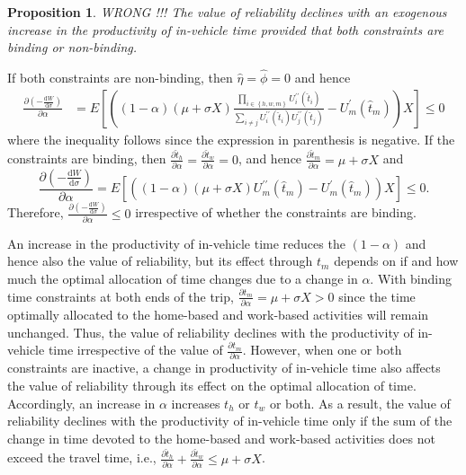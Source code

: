 \documentclass[12pt,a4paper,british]{article}
\makeatletter
\newenvironment{proof}[1][\proofname]{\par
    \normalfont\topsep6\p@\@plus6\p@\relax
    \trivlist
    \itemindent\parindent
    \item[\hskip\labelsep
          \scshape
      #1]\ignorespaces
  }{%
    \endtrivlist\@endpefalse
  }
\providecommand{\proofname}{Proof}
\newtheorem{prop}{Proposition}[section]
\makeatother
\begin{document}

\begin{prop}
	WRONG !!!
The value of reliability declines with an exogenous increase in the productivity of in-vehicle time provided that both constraints are binding or non-binding.
\end{prop}

\begin{proof}
If both constraints are non-binding, then $\hat{\eta}=\hat{\phi}=0$ and hence
\begin{align*}
\frac{\partial\left(-\frac{\mathrm{d}W}{\mathrm{d}\sigma}\right)}{\partial\alpha} &= E\left[\left(\left(1-\alpha\right)\left(\mu+\sigma X\right) \frac{\prod_{i \in \left\{ h,w,m\right\}  }U_{i}^{\prime\prime}\left(\hat{t}_{i}\right)}{\sum_{i\neq j}U_{i}^{\prime\prime}\left(\hat{t}_{i}\right)U_{j}^{\prime\prime}\left(\hat{t}_{j}\right)}-U_{m}^{\prime}\left(\hat{t}_{m}\right)\right)X\right] \leq 0
\end{align*}
where the inequality follows since the expression in parenthesis is negative. If the constraints are binding, then $\frac{\partial\hat{t}_{h}}{\partial\alpha}=\frac{\partial\hat{t}_{w}}{\partial\alpha}=0$, and hence $\frac{\partial\hat{t}_{m}}{\partial\alpha}=\mu+\sigma X$ and
\begin{equation*}
\frac{\partial\left(-\frac{\mathrm{d}W}{\mathrm{d}\sigma}\right)}{\partial\alpha}=E\left[\left(\left(1-\alpha\right)\left(\mu+\sigma X\right)U_{m}^{\prime\prime}\left(\hat{t}_{m}\right)-U_{m}^{\prime}\left(\hat{t}_{m}\right)\right)X\right] \leq 0.
\end{equation*}
Therefore, $\frac{\partial\left(-\frac{\mathrm{d}W}{\mathrm{d}\sigma}\right)}{\partial\alpha} \leq 0 $ irrespective of whether the constraints are binding.
\end{proof}

An increase in the productivity of in-vehicle time reduces the $\left(1-\alpha\right)$ and hence also the value of reliability, but its effect through $t_{m}$ depends on if and how much the optimal allocation of time changes due to a change in $\alpha$. With binding time constraints at both ends of the trip, $\frac{\partial t_{m}}{\partial\alpha}=\mu+\sigma X>0$ since the time optimally allocated to the home-based and work-based activities will remain unchanged. Thus, the value of reliability declines with the productivity of in-vehicle time irrespective of the value of $\frac{\partial t_{m}}{\partial\alpha}$. However, when one or both constraints are inactive, a change in productivity of in-vehicle time also affects the value of reliability through its effect on the optimal allocation of time. Accordingly, an increase in $\alpha$ increases $t_{h}$ or $t_{w}$ or both. As a result, the value of reliability declines with the productivity of in-vehicle time only if the sum of the change in time devoted to the home-based and work-based activities does not exceed the travel time, i.e., $\frac{\partial\hat{t}_{h}}{\partial\alpha}+\frac{\partial\hat{t}_{w}}{\partial\alpha}\leq\mu+\sigma X$.
\end{document}
